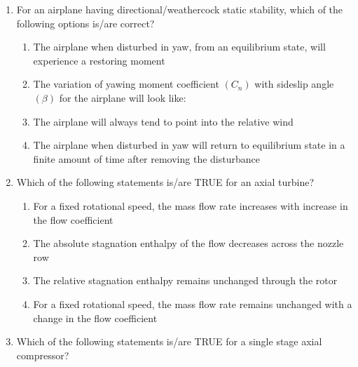 \documentclass[journal,12pt,onecolumn]{IEEEtran}
\theoremstyle{remark}
\begin{document}
\begin{enumerate}
    \item For an airplane having directional/weathercock static stability, which of the following options is/are correct?
    
    \begin{enumerate}
        \item The airplane when disturbed in yaw, from an equilibrium state, will experience a restoring moment
        \item The variation of yawing moment coefficient $(C_n)$ with sideslip angle $(\beta)$ for the airplane will look like:
        
        \begin{figure}[H]
            \centering
            
        \end{figure}
        
        \item The airplane will always tend to point into the relative wind
        \item The airplane when disturbed in yaw will return to equilibrium state in a finite amount of time after removing the disturbance
    \end{enumerate}
    
    \item Which of the following statements is/are TRUE for an axial turbine?
    
    \begin{enumerate}
        \item For a fixed rotational speed, the mass flow rate increases with increase in the flow coefficient
        \item The absolute stagnation enthalpy of the flow decreases across the nozzle row
        \item The relative stagnation enthalpy remains unchanged through the rotor
        \item For a fixed rotational speed, the mass flow rate remains unchanged with a change in the flow coefficient
    \end{enumerate}
    
    \item Which of the following statements is/are TRUE for a single stage axial compressor?
    

\end{enumerate}
\end{document}
